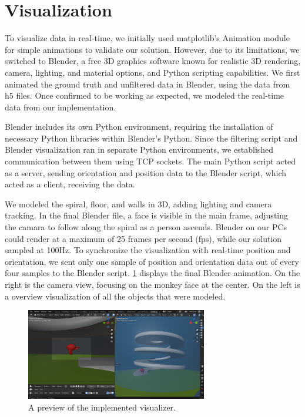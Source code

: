 \section{Visualization}

To visualize data in real-time, we initially used matplotlib's Animation module for simple animations to validate our solution. However, due to its limitations, we switched to Blender, a free 3D graphics software known for realistic 3D rendering, camera, lighting, and material options, and Python scripting capabilities. 
We first animated the ground truth and unfiltered data in Blender, using the data from h5 files. Once confirmed to be working as expected, we modeled the real-time data from our implementation.
\par
Blender includes its own Python environment, requiring the installation of necessary Python libraries within Blender's Python. Since the filtering script and Blender visualization ran in separate Python environments, we established communication between them using TCP sockets. The main Python script acted as a server, sending orientation and position data to the Blender script, which acted as a client, receiving the data.
\par
We modeled the spiral, floor, and walls in 3D, adding lighting and camera tracking. In the final Blender file, a face is visible in the main frame, adjusting the camara to follow along the spiral as a person ascends.
Blender on our PCs could render at a maximum of 25 frames per second (fps), while our solution sampled at 100Hz. To synchronize the visualization with real-time position and orientation, we sent only one sample of position and orientation data out of every four samples to the Blender script.
\cref{viz} displays the final Blender animation. On the right is the camera view, focusing on the monkey face at the center. On the left is a overview visualization of all the objects that were modeled.

\begin{figure}[h] 
	\centering \includegraphics[height=4cm]{./images/visualization.png}
	\caption{A preview of the implemented visualizer.}
	\label{viz}
\end{figure}

